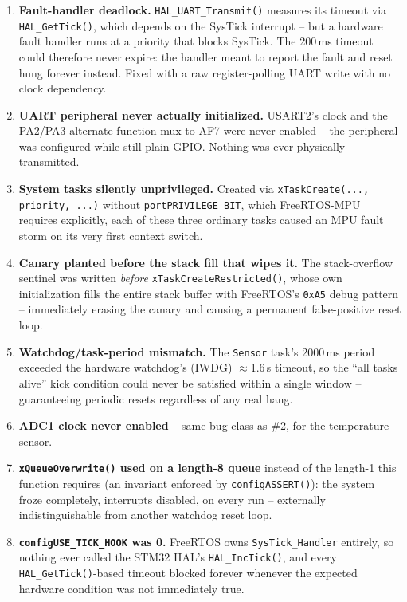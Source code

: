 \documentclass[sigconf,nonacm]{acmart}
\begin{document}
\begin{enumerate}
  \item \textbf{Fault-handler deadlock.} \texttt{HAL\_UART\_Transmit()} measures its timeout via \texttt{HAL\_GetTick()}, which depends on the SysTick interrupt -- but a hardware fault handler runs at a priority that blocks SysTick. The 200\,ms timeout could therefore never expire: the handler meant to report the fault and reset hung forever instead. Fixed with a raw register-polling UART write with no clock dependency.
  \item \textbf{UART peripheral never actually initialized.} USART2's clock and the PA2/PA3 alternate-function mux to AF7 were never enabled -- the peripheral was configured while still plain GPIO. Nothing was ever physically transmitted.
  \item \textbf{System tasks silently unprivileged.} Created via \texttt{xTaskCreate(..., priority, ...)} without \texttt{portPRIVILEGE\_BIT}, which FreeRTOS-MPU requires explicitly, each of these three ordinary tasks caused an MPU fault storm on its very first context switch.
  \item \textbf{Canary planted before the stack fill that wipes it.} The stack-overflow sentinel was written \emph{before} \texttt{xTaskCreateRestricted()}, whose own initialization fills the entire stack buffer with FreeRTOS's \texttt{0xA5} debug pattern -- immediately erasing the canary and causing a permanent false-positive reset loop.
  \item \textbf{Watchdog/task-period mismatch.} The \texttt{Sensor} task's 2000\,ms period exceeded the hardware watchdog's (IWDG) $\approx$1.6\,s timeout, so the ``all tasks alive'' kick condition could never be satisfied within a single window -- guaranteeing periodic resets regardless of any real hang.
  \item \textbf{ADC1 clock never enabled} -- same bug class as \#2, for the temperature sensor.
  \item \textbf{\texttt{xQueueOverwrite()} used on a length-8 queue} instead of the length-1 this function requires (an invariant enforced by \texttt{configASSERT()}): the system froze completely, interrupts disabled, on every run -- externally indistinguishable from another watchdog reset loop.
  \item \textbf{\texttt{configUSE\_TICK\_HOOK} was 0.} FreeRTOS owns \texttt{SysTick\_Handler} entirely, so nothing ever called the STM32 HAL's \texttt{HAL\_IncTick()}, and every \texttt{HAL\_GetTick()}-based timeout blocked forever whenever the expected hardware condition was not immediately true.

\end{enumerate}
\end{document}
